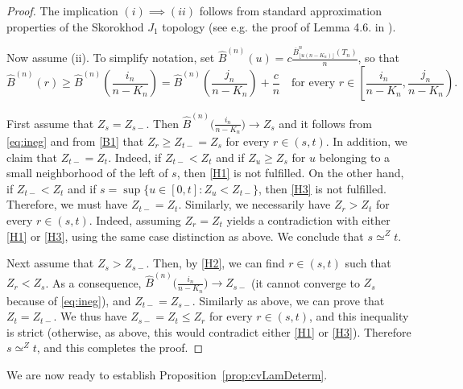 \documentclass[AHL,XML,longabstracts,Unicode]{cedram}
\def\oB{\overline{B}}
\def\hB{\widehat{B}}
\begin{document}
\begin{proof}
The implication $(i) \implies (ii)$ follows from standard approximation properties of the Skorokhod $J_{1}$ topology (see e.g. the proof of Lemma 4.6. in \cite{KM17}).

Now assume (ii). To simplify notation, set $ \hB^{(n)}(u)=c \tfrac{\oB^{n}_{\lfloor u (n-K_{n}) \rfloor}(T_n)}{ n}$, so that
\begin{equation}
\label{eq:ineg} \hB^{(n)}(r) \geq \hB^{(n)} \left(  \frac{i_{n}}{n-K_{n}} \right) =\hB^{(n)} \left(  \frac{j_{n}}{n-K_{n}} \right)+ \frac{c}{n}  \quad \textrm{for every } r \in \left[  \frac{i_{n}}{n-K_{n}}, \frac{j_{n}}{n-K_{n}}  \right).
\end{equation}

First assume that  $Z_{s}=Z_{s-}$.
Then $\hB^{(n)} \big(  \tfrac{i_{n}}{n-K_{n}} \big) \rightarrow Z_{s}$
and it follows from \eqref{eq:ineg} and from \ref{B1} that  $Z_r \ge Z_{t-}=Z_{s}$ for every $r \in (s,t)$.
In addition, we claim that $Z_{t-}=Z_{t}$.
Indeed, if $Z_{t-}<Z_{t}$ and if $Z_{u}\geq Z_{s}$ for $u$ belonging to a small neighborhood of the left of $s$,
then \ref{H1} is not fulfilled.
On the other hand, if $Z_{t-}<Z_{t}$ and if $s=\sup\{ u \in [0,t] : Z_{u} < Z_{t-}\}$, then \ref{H3}
is not fulfilled.
Therefore, we must have $Z_{t-}=Z_{t}$.
Similarly, we necessarily have $Z_{r}>Z_{t}$ for every $r \in (s,t)$.
Indeed, assuming $Z_r=Z_t$ yields a contradiction with either \ref{H1} or \ref{H3},
using the same case distinction as above.
We conclude that $s \simeq^Z t$.

Next assume that $Z_{s}>Z_{s-}$. Then, by \ref{H2}, we can find $r \in (s,t)$ such that $Z_{r}<Z_{s}$.
As a consequence,  $\hB^{(n)} \big(  \tfrac{i_{n}}{n-K_{n}} \big) \rightarrow Z_{s-}$
(it cannot converge to $Z_s$ because of \eqref{eq:ineg}), and $Z_{t-}=Z_{s-}$.
Similarly as above, we can prove that $Z_{t}=Z_{t-}$.
We thus have $Z_{s-}=Z_{t} \leq Z_{r}$ for every $r \in (s,t)$,
and this inequality is strict (otherwise, as above, this would contradict either \ref{H1} or \ref{H3}).
Therefore $s \simeq^Z t$, and this completes the proof.
\end{proof}

We are now ready to establish Proposition~\ref{prop:cvLamDeterm}.
\end{document}
